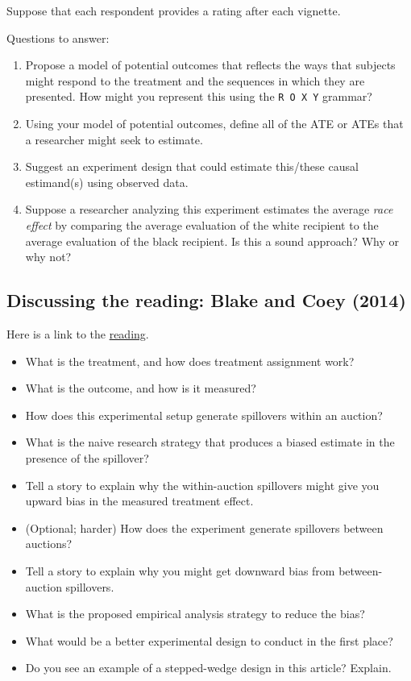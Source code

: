 \documentclass[
]{article}
\providecommand{\tightlist}{%
  \setlength{\itemsep}{0pt}\setlength{\parskip}{0pt}}
\begin{document}
Suppose that each respondent provides a rating after each vignette.

Questions to answer:

\begin{enumerate}
\def\labelenumi{\arabic{enumi}.}
\tightlist
\item
  Propose a model of potential outcomes that reflects the ways that subjects might respond to the treatment and the sequences in which they are presented. How might you represent this using the \texttt{R\ O\ X\ Y} grammar?
\item
  Using your model of potential outcomes, define all of the ATE or ATEs that a researcher might seek to estimate.
\item
  Suggest an experiment design that could estimate this/these causal estimand(s) using observed data.
\item
  Suppose a researcher analyzing this experiment estimates the average \emph{race effect} by comparing the average evaluation of the white recipient to the average evaluation of the black recipient. Is this a sound approach? Why or why not?
\end{enumerate}

\hypertarget{discussing-the-reading-blake-and-coey-2014}{%
\subsection{Discussing the reading: Blake and Coey (2014)}\label{discussing-the-reading-blake-and-coey-2014}}

Here is a link to the \href{https://github.com/UC-Berkeley-I-School/mids-w241/blob/main/readings/Blake.2014.pdf}{reading}.

\begin{itemize}
\item
  What is the treatment, and how does treatment assignment work?
\item
  What is the outcome, and how is it measured?
\item
  How does this experimental setup generate spillovers within an auction?
\item
  What is the naive research strategy that produces a biased estimate in the presence of the spillover?
\item
  Tell a story to explain why the within-auction spillovers might give you upward bias in the measured treatment effect.
\item
  (Optional; harder) How does the experiment generate spillovers between auctions?
\item
  Tell a story to explain why you might get downward bias from between-auction spillovers.
\item
  What is the proposed empirical analysis strategy to reduce the bias?
\item
  What would be a better experimental design to conduct in the first place?
\item
  Do you see an example of a stepped-wedge design in this article? Explain.
\end{itemize}
\end{document}
